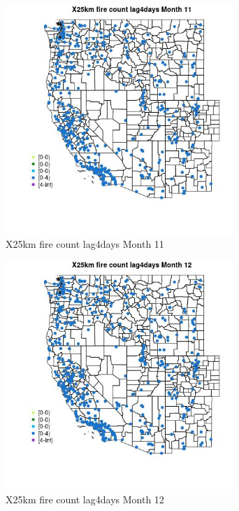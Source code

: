 \begin{figure} 
\centering  
\includegraphics[width=0.77\textwidth]{Code_Outputs/Report_ML_input_PM25_Step4_part_e_de_duplicated_aves_compiled_2019-05-14wNAs_MapObsMo11X25km_fire_count_lag4days.jpg} 
\caption{\label{fig:Report_ML_input_PM25_Step4_part_e_de_duplicated_aves_compiled_2019-05-14wNAsMapObsMo11X25km_fire_count_lag4days}X25km fire count lag4days Month 11} 
\end{figure} 
 

\begin{figure} 
\centering  
\includegraphics[width=0.77\textwidth]{Code_Outputs/Report_ML_input_PM25_Step4_part_e_de_duplicated_aves_compiled_2019-05-14wNAs_MapObsMo12X25km_fire_count_lag4days.jpg} 
\caption{\label{fig:Report_ML_input_PM25_Step4_part_e_de_duplicated_aves_compiled_2019-05-14wNAsMapObsMo12X25km_fire_count_lag4days}X25km fire count lag4days Month 12} 
\end{figure} 
 

